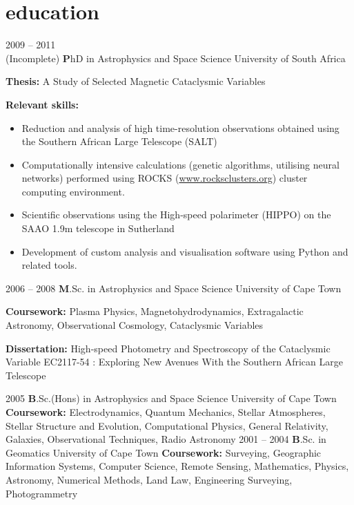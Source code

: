 \documentclass[]{friggeri-cv} %
\begin{document}
\section{education}
\begin{entrylist}
\entry
{2009 -- 2011 \\(Incomplete)}
{\textbf PhD in Astrophysics and Space Science}
{University of South Africa}
{{\textbf{Thesis:} A Study of Selected Magnetic Cataclysmic Variables}

{\textbf{Relevant skills:}
    \begin{itemize}
        \item Reduction and analysis of high time-resolution observations obtained using the Southern African Large Telescope (SALT)
        \item Computationally intensive calculations (genetic algorithms, utilising neural networks) performed
        using ROCKS (\url{www.rocksclusters.org}) cluster computing environment.
        \item Scientific observations using the High-speed polarimeter (HIPPO) on the SAAO 1.9m telescope in
        Sutherland
        \item Development of custom analysis and visualisation software using Python and related tools.
\end{itemize}}
}
\end{entrylist}
\begin{entrylist}
\entry
{2006 -- 2008}
{\textbf M.Sc. in Astrophysics and Space Science}
{University of Cape Town}
{{\textbf{Coursework:} Plasma Physics, Magnetohydrodynamics, Extragalactic Astronomy, Observational
Cosmology, Cataclysmic Variables}

{\textbf{Dissertation:} High-speed Photometry and Spectroscopy of the Cataclysmic Variable EC2117-54 : Exploring New Avenues With the Southern African Large Telescope }}
\end{entrylist}
\begin{entrylist}
\entry
{2005}
{\textbf B.Sc.(Hons) in Astrophysics and Space Science}
{University of Cape Town}
{{\textbf{Coursework:} Electrodynamics, Quantum Mechanics, Stellar Atmospheres, Stellar Structure and Evolution, Computational Physics, General Relativity, Galaxies, Observational Techniques, Radio Astronomy}}
\entry
{2001 -- 2004}
{\textbf B.Sc. in Geomatics}
{University of Cape Town}
{{\textbf{Coursework:} Surveying, Geographic Information Systems, Computer Science, Remote Sensing,
Mathematics, Physics, Astronomy, Numerical Methods, Land Law, Engineering Surveying,
Photogrammetry}}
\end{entrylist}
\end{document}
